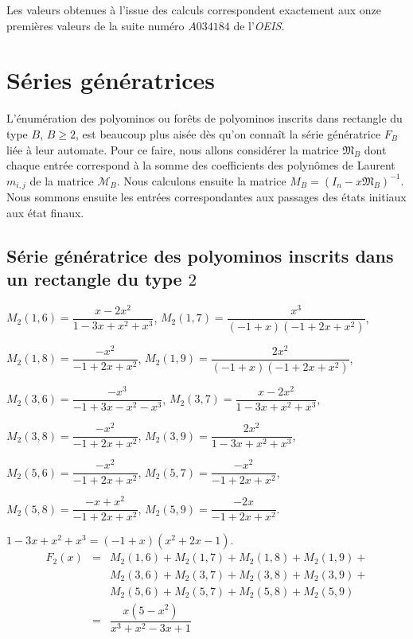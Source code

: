Les valeurs obtenues à l'issue des calculs correspondent exactement aux onze premières valeurs de la suite numéro $A034184$  de l'\emph{OEIS}.

\section{Séries génératrices}
L'énumération des polyominos ou forêts de polyominos inscrits dans rectangle du type $B$, $B\geq 2$, est beaucoup plus aisée dès qu'on connaît la série génératrice $F_{B}$ liée à leur automate.  Pour ce faire, nous allons considérer la matrice $\mathfrak{M}_{B}$ dont chaque entrée correspond à la somme des coefficients des polynômes de Laurent $m_{i,j}$ de la matrice $\mathcal{M}_{B}$. Nous calculons ensuite la matrice $\mathit{M}_{B}=(I_{n}-x\mathfrak{M}_{B})^{-1}$. Nous sommons ensuite les entrées correspondantes aux passages des états initiaux aux état finaux.

\subsection{Série génératrice des polyominos inscrits dans un rectangle du type $2$}


$\mathit{M}_{2}(1,6)= \dfrac{x-2x^{2}}{1-3x+x^{2}+x^{3}}$,
$\mathit{M}_{2}(1,7)= \dfrac{x^3}{(-1+x)(-1+2x+x^2)}$,

$\mathit{M}_{2}(1,8)= \dfrac{-x^2}{-1+2x+x^2}$,
$\mathit{M}_{2}(1,9)= \dfrac{2x^2}{(-1+x)(-1+2x+x^2)}$,

$\mathit{M}_{2}(3,6)=\dfrac{-x^{3}}{-1+3x-x^{2}-x^{3}}$,
$\mathit{M}_{2}(3,7)= \dfrac{x-2x^{2}}{1-3x+x^{2}+x^{3}}$,

$\mathit{M}_{2}(3,8)= \dfrac{-x^2}{-1+2x+x^2}$,
$\mathit{M}_{2}(3,9)= \dfrac{2x^{2}}{1-3x+x^{2}+x^{3}}$,

$\mathit{M}_{2}(5,6)=\dfrac{-x^2}{-1+2x+x^2}$,
$\mathit{M}_{2}(5,7)=\dfrac{-x^2}{-1+2x+x^2}$,

$\mathit{M}_{2}(5,8)=\dfrac{-x+x^2}{-1+2x+x^2}$,
$\mathit{M}_{2}(5,9)=\dfrac{-2x}{-1+2x+x^2}$.

$1-3x+x^{2}+x^{3}= (-1+x)(x^{2}+2x-1)$.
\begin{eqnarray*}
F_{2}(x) & = & \mathit{M}_{2}(1,6)+\mathit{M}_{2}(1,7) + \mathit{M}_{2}(1,8)+\mathit{M}_{2}(1,9) +\\
& & \mathit{M}_{2}(3,6)+\mathit{M}_{2}(3,7)+\mathit{M}_{2}(3,8)+\mathit{M}_{2}(3,9)+\\
& & \mathit{M}_{2}(5,6) +\mathit{M}_{2}(5,7)+ \mathit{M}_{2}(5,8)+\mathit{M}_{2}(5,9)\\
&=& \dfrac{x(5 - x^{2})}{x^{3} + x^{2} - 3x + 1}
\end{eqnarray*}


